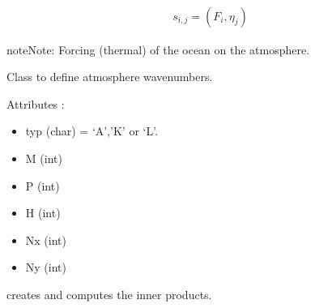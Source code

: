 \documentclass[letterpaper,10pt,english]{sphinxmanual}
\begin{document}
\begin{fulllineitems}
\begin{fulllineitems}
\end{fulllineitems}


\begin{fulllineitems}
\label{rstfiles/inprod_analytic:inprod_analytic.atm_tensors.calculate_s}~\begin{equation*}
\begin{split}s_{i,j} = (F_i, \eta_j)\end{split}
\end{equation*}
\begin{notice}{note}{Note:}
Forcing (thermal) of the ocean on the atmosphere.
\end{notice}

\end{fulllineitems}


\end{fulllineitems}


\begin{fulllineitems}
\label{rstfiles/inprod_analytic:inprod_analytic.atm_wavenum}
Class to define atmosphere wavenumbers.

Attributes :
\begin{itemize}
\item {} 
typ (char) = `A','K' or `L'.

\item {} 
M (int)

\item {} 
P (int)

\item {} 
H (int)

\item {} 
Nx (int)

\item {} 
Ny (int)

\end{itemize}

\end{fulllineitems}


\begin{fulllineitems}
\label{rstfiles/inprod_analytic:inprod_analytic.init_inprod}
creates and computes the inner products.

\end{fulllineitems}
\end{document}
